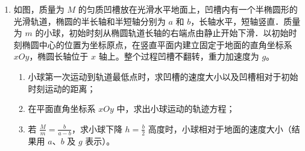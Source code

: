 \documentclass[\gkver]{gaokaozhenti}
\begin{document}
\begin{enumerate}
\item
如图，质量为 $M$ 的匀质凹槽放在光滑水平地面上，凹槽内有一个半椭圆形的光滑轨道，椭圆的半长轴和半短轴分别为 $a$ 和 $b$，长轴水平，短轴竖直．质量为 $m$ 的小球，初始时刻从椭圆轨道长轴的右端点由静止开始下滑．以初始时刻椭圆中心的位置为坐标原点，在竖直平面内建立固定于地面的直角坐标系 $xOy$，椭圆长轴位于 $x$ 轴上。整个过程凹槽不翻转，重力加速度为 $g$。
\begin{enumerate}
	\item
	小球第一次运动到轨道最低点时，求凹槽的速度大小以及凹槽相对于初始时刻运动的距离；
	\item
	在平面直角坐标系 $xOy$ 中，求出小球运动的轨迹方程；
	\item
	若 $\frac{M}{m} = \frac{b}{{a - b}}$，求小球下降 $h = \frac{b}{2}$ 高度时，小球相对于地面的速度大小（结果用 $a$、$b$ 及 $g$ 表示）。
\end{enumerate}

\end{enumerate}
\end{document}
